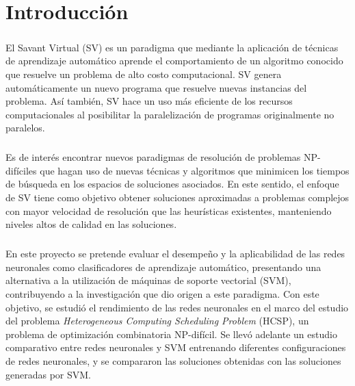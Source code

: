 \chapter{Introducción} \label{section-introduccion}

\paragraph{} El Savant Virtual (SV) es un paradigma que mediante la aplicación de técnicas de aprendizaje automático aprende el comportamiento de un algoritmo conocido que resuelve un problema de alto costo computacional. SV genera automáticamente un nuevo programa que resuelve nuevas instancias del problema.\cite{savant-original}
Así también, SV hace un uso más eficiente de los recursos computacionales al posibilitar la paralelización de programas originalmente no paralelos.

\paragraph{} Es de interés encontrar nuevos paradigmas de resolución de problemas NP-difíciles que hagan uso de nuevas técnicas y algoritmos que minimicen los tiempos de búsqueda en los espacios de soluciones asociados.
En este sentido, el enfoque de SV tiene como objetivo obtener soluciones aproximadas a problemas complejos con mayor velocidad de resolución que las heurísticas existentes, manteniendo niveles altos de calidad en las soluciones. 

\paragraph{} En este proyecto se pretende evaluar el desempeño y la aplicabilidad de las redes neuronales como clasificadores de aprendizaje automático, presentando una alternativa a la utilización de máquinas de soporte vectorial (SVM), contribuyendo a la investigación que dio origen a este paradigma.
Con este objetivo, se estudió el rendimiento de las redes neuronales en el marco del estudio del problema \textit{Heterogeneous Computing Scheduling Problem} (HCSP), un problema de optimización combinatoria NP-difícil.
Se llevó adelante un estudio comparativo entre redes neuronales y SVM entrenando diferentes configuraciones de redes neuronales, y se compararon las soluciones obtenidas con las soluciones generadas por SVM. 

\newpage %

